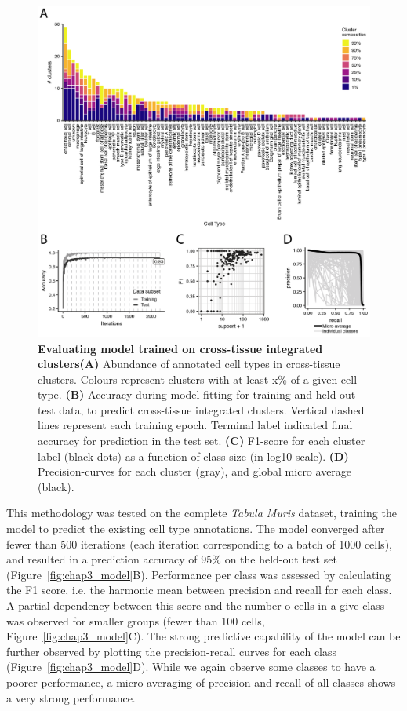 \begin{figure}[ht!]
    \centering    
    \includegraphics[width=1.0\textwidth]{Chapter3/Figs/chap3_modelcl.png} %
    \caption[Evaluating model trained on cross-tissue integrated clusters]{\textbf{Evaluating model trained on cross-tissue integrated clusters}\newline\textbf{(A)} Abundance of annotated cell types in cross-tissue clusters. Colours represent clusters with at least x\% of a given cell type. \textbf{(B)} Accuracy during model fitting for training and held-out test data, to predict cross-tissue integrated clusters. Vertical dashed lines represent each training epoch. Terminal label indicated final accuracy for prediction in the test set. \textbf{(C)} F1-score for each cluster label (black dots) as a function of class size (in log10 scale). \textbf{(D)} Precision-curves for each cluster (gray), and global micro average (black).}
    \label{fig:chap3_modelcl}
\end{figure}

This methodology was tested on the complete \textit{Tabula Muris} dataset, training the model to predict the existing cell type annotations. The model converged after fewer than 500 iterations (each iteration corresponding to a batch of 1000 cells), and resulted in a prediction accuracy of 95\% on the held-out test set (Figure~\ref{fig:chap3_model}B). Performance per class was assessed by calculating the F1 score, i.e. the harmonic mean between precision and recall for each class. A partial dependency between this score and the number o cells in a give class was observed for smaller groups (fewer than 100 cells, Figure~\ref{fig:chap3_model}C). The strong predictive capability of the model can be further observed by plotting the precision-recall curves for each class (Figure~\ref{fig:chap3_model}D). While we again observe some classes to have a poorer performance, a micro-averaging of precision and recall of all classes shows a very strong performance.

